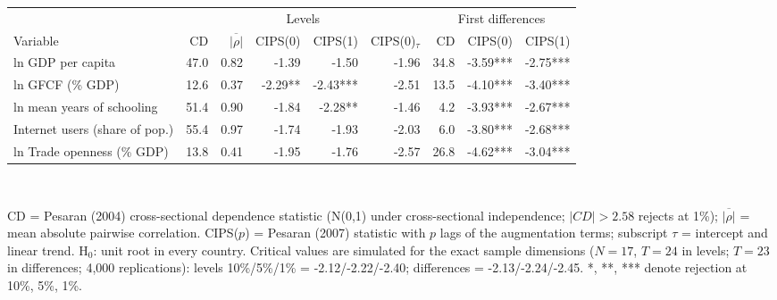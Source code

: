 \begin{tabular}{lrrrrrrrr}\toprule
 & \multicolumn{5}{c}{Levels} & \multicolumn{3}{c}{First differences} \\
Variable & CD & $\overline{|\rho|}$ & CIPS(0) & CIPS(1) & CIPS(0)$_{\tau}$ & CD & CIPS(0) & CIPS(1) \\
\midrule
ln GDP per capita & 47.0 & 0.82 & -1.39 & -1.50 & -1.96 & 34.8 & -3.59*** & -2.75*** \\
ln GFCF (\% GDP) & 12.6 & 0.37 & -2.29** & -2.43*** & -2.51 & 13.5 & -4.10*** & -3.40*** \\
ln mean years of schooling & 51.4 & 0.90 & -1.84 & -2.28** & -1.46 & 4.2 & -3.93*** & -2.67*** \\
Internet users (share of pop.) & 55.4 & 0.97 & -1.74 & -1.93 & -2.03 & 6.0 & -3.80*** & -2.68*** \\
ln Trade openness (\% GDP) & 13.8 & 0.41 & -1.95 & -1.76 & -2.57 & 26.8 & -4.62*** & -3.04*** \\
\bottomrule\end{tabular}
\\[3pt]\begin{minipage}{\tablewidth}\footnotesize CD = Pesaran (2004) cross-sectional dependence statistic (N(0,1) under cross-sectional independence; $|CD|>2.58$ rejects at 1\%); $\overline{|\rho|}$ = mean absolute pairwise correlation. CIPS($p$) = Pesaran (2007) statistic with $p$ lags of the augmentation terms; subscript $\tau$ = intercept and linear trend. H$_0$: unit root in every country. Critical values are simulated for the exact sample dimensions ($N=17$, $T=24$ in levels; $T=23$ in differences; 4,000 replications): levels 10\%/5\%/1\% = -2.12/-2.22/-2.40; differences = -2.13/-2.24/-2.45. *, **, *** denote rejection at 10\%, 5\%, 1\%.\end{minipage}
